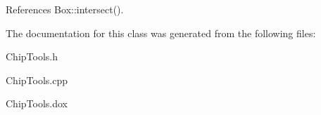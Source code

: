 References Box\-::intersect().



The documentation for this class was generated from the following files\-:\begin{DoxyCompactItemize}
\item 
Chip\-Tools.\-h\item 
Chip\-Tools.\-cpp\item 
Chip\-Tools.\-dox\end{DoxyCompactItemize}
